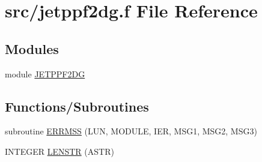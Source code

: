 \hypertarget{jetppf2dg_8f}{
\section{src/jetppf2dg.f File Reference}
\label{jetppf2dg_8f}
}
\subsection*{Modules}
\begin{CompactItemize}
\item 
module \hyperlink{namespaceJETPPF2DG}{JETPPF2DG}
\end{CompactItemize}
\subsection*{Functions/Subroutines}
\begin{CompactItemize}
\item 
subroutine \hyperlink{jetppf2dg_8f_88b4bbb0de229b4aa029fbc5b4f04d38}{ERRMSS} (LUN, MODULE, IER, MSG1, MSG2, MSG3)
\item 
INTEGER \hyperlink{jetppf2dg_8f_8beaeacd88b0646f07683a6b6d148ca4}{LENSTR} (ASTR)
\end{CompactItemize}
